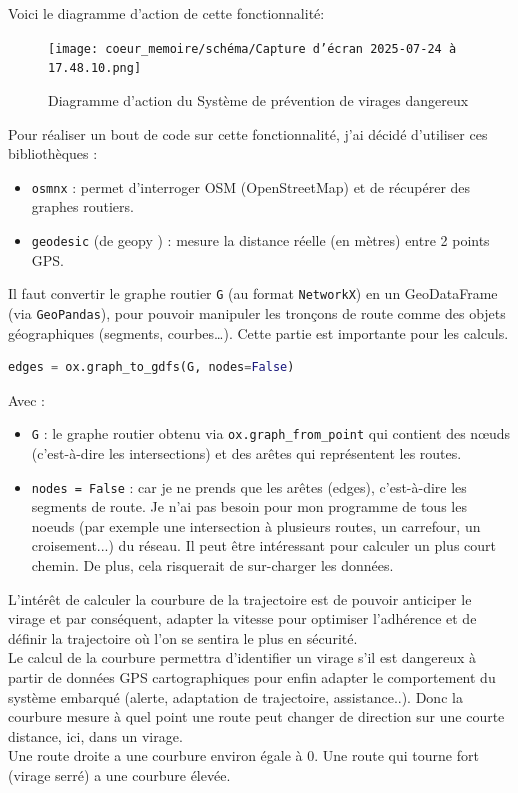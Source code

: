 Voici le diagramme d'action de cette fonctionnalité:\\

\begin{figure}[H]
    \centering
    \texttt{[image: coeur\_memoire/schéma/Capture d’écran 2025-07-24 à 17.48.10.png]} 
    \caption{Diagramme d'action du Système de prévention de virages dangereux}
\end{figure}

Pour réaliser un bout de code sur cette fonctionnalité, j'ai décidé d'utiliser ces bibliothèques :
\begin{itemize}
    \item \texttt{osmnx}\cite{osm_doc} : permet d’interroger OSM (OpenStreetMap) et de récupérer des graphes routiers.
    \item \texttt{geodesic} (de geopy \cite{geopy}) : mesure la distance réelle (en mètres) entre 2 points GPS.
\end{itemize}
\vspace{0.5cm}

Il faut convertir le graphe routier \texttt{G} (au format \texttt{NetworkX}) en un GeoDataFrame (via \texttt{GeoPandas}), pour pouvoir manipuler les tronçons de route comme des objets géographiques (segments, courbes…). Cette partie est importante pour les calculs.
\begin{lstlisting}[language=Python, caption={Conversion du graphe routier}]
edges = ox.graph_to_gdfs(G, nodes=False)
\end{lstlisting}
Avec :
\begin{itemize}
    \item \texttt{G} : le graphe routier obtenu via \texttt{ox.graph\_from\_point} qui contient des nœuds (c'est-à-dire les intersections) et des arêtes qui représentent les routes.
    \item \texttt{nodes = False} : car je ne prends que les arêtes (edges), c’est-à-dire les segments de route. Je n'ai pas besoin pour mon programme de tous les noeuds (par exemple une intersection à plusieurs routes, un carrefour, un croisement...) du réseau. Il peut être intéressant pour calculer un plus court chemin. De plus, cela risquerait de sur-charger les données.
\end{itemize}

\vspace{0.5cm}
L'intérêt de calculer la courbure de la trajectoire est de pouvoir anticiper le virage et par conséquent, adapter la vitesse pour optimiser l'adhérence et de définir la trajectoire où l'on se sentira le plus en sécurité. \\
Le calcul de la courbure permettra d'identifier un virage s'il est dangereux à partir de données GPS cartographiques pour enfin adapter le comportement du système embarqué (alerte, adaptation de trajectoire, assistance..).
Donc la courbure mesure à quel point une route peut changer de direction sur une courte distance, ici, dans un virage.\\
Une route droite a une courbure environ égale à 0. Une route qui tourne fort (virage serré) a une courbure élevée.

